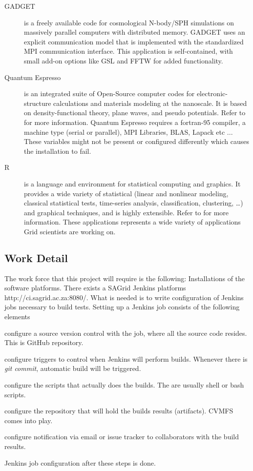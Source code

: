 \documentclass [titlepage,11pt]{article}
\begin{document}
\begin{description}
\item[GADGET] is a freely available code for cosmological N-body/SPH simulations on massively parallel computers with distributed memory. GADGET uses an explicit communication model that is implemented with the standardized MPI communication interface. This application is self-contained, with small add-on options like GSL and FFTW for added functionality. 

\item[Quantum Espresso] is an integrated suite of Open-Source computer codes for electronic-structure calculations and materials modeling at the nanoscale. It is based on density-functional theory, plane waves, and pseudo potentials. Refer to \citep{Qespresso} for more information. Quantum Espresso requires a fortran-95 compiler, a machine type (serial or parallel), MPI Libraries, BLAS, Lapack etc ... These variables might not be present or configured differently which causes the installation to fail.  

\item[R] is a language and environment for statistical computing and graphics. It provides a wide variety of statistical (linear and nonlinear modeling, classical statistical tests, time-series analysis, classification, clustering, …) and graphical techniques, and is highly extensible. Refer to \citep{R} for more information. These applications represents a wide variety of applications Grid scientists are working on.
\end{description} 

\subsection{Work Detail}
The work force that this project will require is the following:
Installations of the software platforms. There exists a SAGrid Jenkins platforms http://ci.sagrid.ac.za:8080/. What is needed is to write configuration of Jenkins jobs necessary to build tests. Setting up a Jenkins job  consists of the following elements \begin{enumerate*}[label=\itshape\alph*\upshape)]
\item configure a source version control with the job, where all the source code resides. This is GitHub repository.
\item configure triggers to control when Jenkins will perform builds. Whenever there is \emph{git commit}, automatic build will be triggered. 
\item configure the scripts that actually does the builds. The are usually shell or bash scripts.
\item configure the repository that will hold the builds results (artifacts). CVMFS comes into play.
\item configure notification via email or issue tracker to collaborators with the build results.
\end{enumerate*} 
Jenkins job configuration after these steps is done. \\
\end{document}
